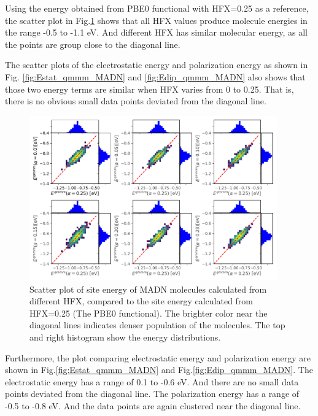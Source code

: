 \documentclass[letterpaper,12pt]{article}
\begin{document}
Using the energy obtained from PBE0 functional with HFX=0.25 as a reference, the scatter plot in Fig.\ref{fig:E_qmmm_MADN} shows that all HFX values produce molecule energies in the range -0.5 to -1.1 eV. And different HFX has similar molecular energy, as all the points are group close to the diagonal line. 

The scatter plots of the electrostatic energy and polarization energy as shown in Fig. \ref{fig:Estat_qmmm_MADN} and \ref{fig:Edip_qmmm_MADN} also shows that those two energy terms are similar when HFX varies from 0 to 0.25. That is, there is no obvious small data points deviated from the diagonal line. 

\begin{figure}[H]
    \centering
    \includegraphics[width=0.95\textwidth]{figs/MADN_HFX/scatterE_qmmm.pdf}
    \caption{Scatter plot of site energy of MADN molecules calculated from different HFX, compared to the site energy calculated from HFX=0.25 (The PBE0 functional). The brighter color near the diagonal lines indicates denser population of the molecules.  The top and right histogram show the energy distributions.}
    \label{fig:E_qmmm_MADN}
\end{figure}

Furthermore, the plot comparing  electrostatic energy and polarization energy are shown in Fig.\ref{fig:Estat_qmmm_MADN} and Fig.\ref{fig:Edip_qmmm_MADN}.
The electrostatic energy has a range of 0.1 to -0.6 eV. And there are no small data points deviated from the diagonal line. 
The polarization energy has a range of -0.5 to -0.8 eV. And the data points are again clustered near the diagonal line. 
\end{document}
